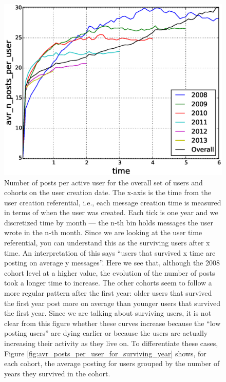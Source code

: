 

\begin{figure}[!tb]
\centering
\includegraphics[scale=0.4]{./images/avr_posts_per_user_cohorts.eps}
\caption{Number of posts per active user for  the overall set of users and cohorts on the user creation date. The x-axis is the time from the user creation referential, i.e., each message creation time is measured in terms of when the user was created. Each tick is one year and we discretized time by month --- the n-th bin holds messages the user wrote in the n-th month. Since we are looking at the user time referential, you can understand this as the surviving users after x time. An interpretation of this says ``users that survived x time are posting on average y messages''. Here we see that, although the 2008 cohort level at a higher value, the evolution of the number of posts took a longer time to increase. The other cohorts seem to follow a more regular pattern after the first year: older users that survived the first year post more on average than younger users that survived the first year. Since we are talking about surviving users, it is not clear from this figure whether these curves increase because the ``low posting users'' are dying earlier or because the users are actually increasing their activity as they live on. To differentiate these cases, Figure \ref{fig:avr_posts_per_user_for_surviving_year} shows, for each cohort, the average posting for users grouped by the number of years they survived in the cohort.}
\label{fig:avr_posts_per_user_cohorts_relative}
\end{figure}
